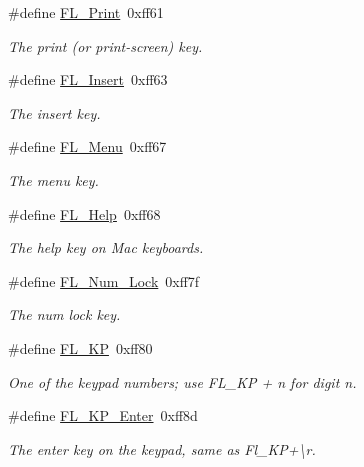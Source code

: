 \begin{Indent}
\begin{DoxyCompactItemize}
\#define \hyperlink{_enumerations_8_h_a4b01dd00e8057590d3778a41920cf80f}{F\+L\+\_\+\+Print}~0xff61
\begin{DoxyCompactList}\small\item\em The print (or print-\/screen) key. \end{DoxyCompactList}\item 
\#define \hyperlink{_enumerations_8_h_ae18bfb47b2b5d5579d227d522a3ce32c}{F\+L\+\_\+\+Insert}~0xff63
\begin{DoxyCompactList}\small\item\em The insert key. \end{DoxyCompactList}\item 
\#define \hyperlink{_enumerations_8_h_a3a59855ebd5a902cda138956b5ac80bb}{F\+L\+\_\+\+Menu}~0xff67
\begin{DoxyCompactList}\small\item\em The menu key. \end{DoxyCompactList}\item 
\#define \hyperlink{_enumerations_8_h_aea65b2b57d3d83d1359df6fc538ff0a9}{F\+L\+\_\+\+Help}~0xff68
\begin{DoxyCompactList}\small\item\em The \textquotesingle{}help\textquotesingle{} key on Mac keyboards. \end{DoxyCompactList}\item 
\#define \hyperlink{_enumerations_8_h_acf1721eb766274a915bed57acf0e7636}{F\+L\+\_\+\+Num\+\_\+\+Lock}~0xff7f
\begin{DoxyCompactList}\small\item\em The num lock key. \end{DoxyCompactList}\item 
\#define \hyperlink{_enumerations_8_h_a61cc4275772d96a740bef9261cca5760}{F\+L\+\_\+\+KP}~0xff80
\begin{DoxyCompactList}\small\item\em One of the keypad numbers; use F\+L\+\_\+\+KP + \textquotesingle{}n\textquotesingle{} for digit n. \end{DoxyCompactList}\item 
\#define \hyperlink{_enumerations_8_h_af6ac160165f8c2747488175321f45a63}{F\+L\+\_\+\+K\+P\+\_\+\+Enter}~0xff8d
\begin{DoxyCompactList}\small\item\em The enter key on the keypad, same as Fl\+\_\+\+K\+P+\textquotesingle{}\textbackslash{}r\textquotesingle{}. \end{DoxyCompactList}\item 

\end{DoxyCompactItemize}
\end{Indent}
